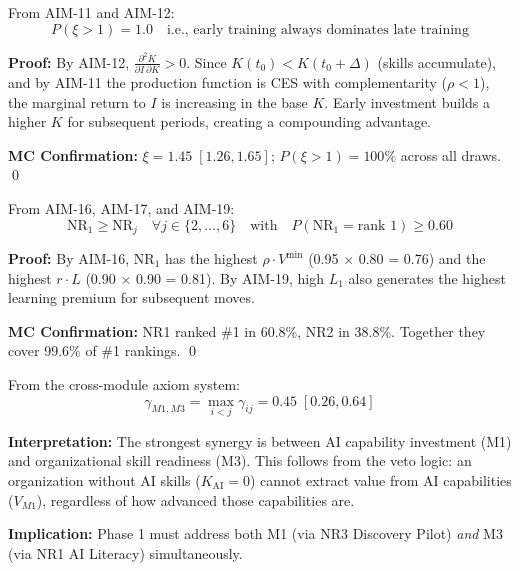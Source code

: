 \begin{proposition}
\label{prop:aim-early-training}
From AIM-11 and AIM-12:
\begin{equation}
P(\xi > 1) = 1.0
\quad \text{i.e., early training always dominates late training}
\end{equation}

\textbf{Proof:} By AIM-12, $\frac{\partial^2 K}{\partial I \, \partial K} > 0$.
Since $K(t_0) < K(t_0 + \Delta)$ (skills accumulate), and by AIM-11 the
production function is CES with complementarity ($\rho < 1$), the marginal
return to $I$ is increasing in the base $K$. Early investment builds a
higher $K$ for subsequent periods, creating a compounding advantage.

\textbf{MC Confirmation:} $\xi = 1.45 \; [1.26, 1.65]$;
$P(\xi > 1) = 100\%$ across all draws. \qed
\end{proposition}


\begin{proposition}
\label{prop:aim-nr-priority}
From AIM-16, AIM-17, and AIM-19:
\begin{equation}
\text{NR}_1 \geq \text{NR}_j \quad \forall j \in \{2,\ldots,6\}
\quad \text{with} \quad P(\text{NR}_1 = \text{rank } 1) \geq 0.60
\end{equation}

\textbf{Proof:} By AIM-16, $\text{NR}_1$ has the highest $\rho \cdot V^{\min}$
(0.95 $\times$ 0.80 = 0.76) and the highest $r \cdot L$ (0.90 $\times$ 0.90 = 0.81).
By AIM-19, high $L_1$ also generates the highest learning premium for
subsequent moves.

\textbf{MC Confirmation:} NR1 ranked \#1 in 60.8\%, NR2 in 38.8\%.
Together they cover 99.6\% of \#1 rankings. \qed
\end{proposition}


\begin{proposition}
\label{prop:aim-strongest-gamma}
From the cross-module axiom system:
\begin{equation}
\gamma_{M1,M3} = \max_{i<j} \gamma_{ij} = 0.45 \; [0.26, 0.64]
\end{equation}

\textbf{Interpretation:} The strongest synergy is between AI capability
investment (M1) and organizational skill readiness (M3). This follows
from the veto logic: an organization without AI skills ($K_{\text{AI}} = 0$)
cannot extract value from AI capabilities ($V_{M1}$), regardless of how
advanced those capabilities are.

\textbf{Implication:} Phase 1 must address both M1 (via NR3 Discovery Pilot)
\emph{and} M3 (via NR1 AI Literacy) simultaneously.
\end{proposition}


